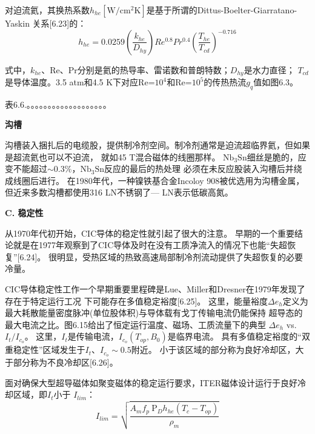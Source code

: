 对迫流氦，其换热系数$h_{he}[\mathrm{W/cm^2 K}]$是基于所谓的Dittus-Boelter-Giarratano-Yaskin
关系[6.23]的：
\begin{equation}%
h_{he}=0.0259(\frac{k_{he}}{D_{hy}})Re^{0.8}Pr^{0.4}(\frac{T_{he}}{T_{cd}})^{-0.716}
\end{equation}

式中，$k_{he}$、Re、Pr分别是氦的热导率、雷诺数和普朗特数；$D_{hy}$是水力直径；
$T_{cd}$是导体温度。3.5 atm和4.5 K下对应Re=$10^4$和Re=$10^5$的传热热流$g_q$值如图6.3。

表6.6.。。。。。。。。。。。。。。。。。。。

\textbf{沟槽}

沟槽装入捆扎后的电缆股，提供制冷剂空间。制冷剂通常是迫流超临界氦，但如果是超流氦也可以不迫流，
就如45 T混合磁体的线圈那样。
$\mathrm{Nb_3Sn}$细丝是脆的，应变不能超过$\sim 0.3\%$，$\mathrm{Nb_3Sn}$反应的最后的热处理
必须在未反应股装入沟槽后并绕成线圈后进行。
在1980年代，一种镍铁基合金Incoloy 908被优选用为沟槽金属，但近来多数沟槽都使用316 LN不锈钢了---
LN表示低碳高氮。

\textbf{C. 稳定性}

从1970年代初开始，CIC导体的稳定性就引起了很大的注意。
早期的一个重要结论就是在1977年观察到了CIC导体及时在没有工质净流入的情况下也能“失超恢复”[6.24]。
很明显，受热区域的热致高速局部制冷剂流动提供了失超恢复的必要冷量。

CIC导体稳定性工作一个早期重要里程碑是Lue、Miller和Dresner在1979年发现了存在于特定运行工况
下可能存在多值稳定裕度[6.25]。
这里，能量裕度$\Delta e_h$定义为最大耗散能量密度脉冲(单位股体积)与导体载有戈丁传输电流仍能保持
超导态的最大电流之比。图6.15给出了恒定运行温度、磁场、工质流量下的典型
$\Delta e_h$ vs. $I_t/I_{c_o}$。
这里，$I_t$是传输电流，$I_{c_o}(T_{op},B_0)$是临界电流。
具有多值稳定裕度的“双重稳定性”区域发生于$I_t、I_{c_o}\sim 0.5$附近。
小于该区域的部分称为良好冷却区，大于部分称为不良冷却区[6.26]。

面对确保大型超导磁体如聚变磁体的稳定运行要求，ITER磁体设计运行于良好冷却区域，即$I_t$小于
$I_{lim}$：
\begin{equation}%
I_{lim}=\sqrt{\frac{A_mf_p\ \mathrm{P}_Dh_{he}(T_c-T_{op})}{\rho_m}}
\end{equation}

